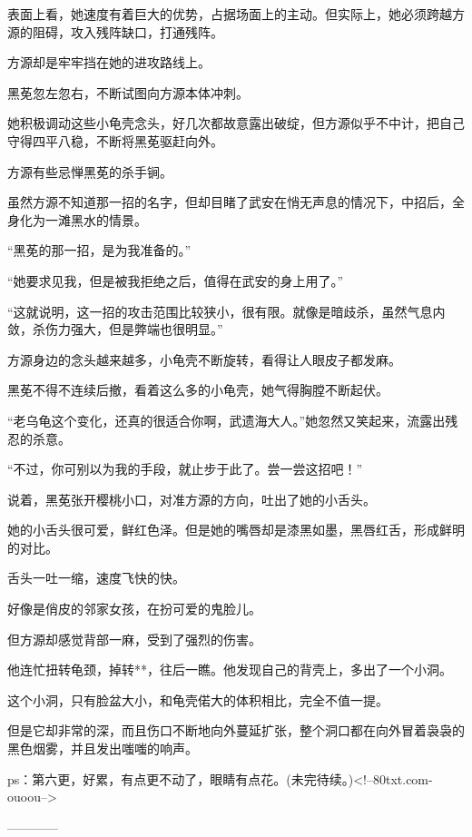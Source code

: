 \begin{this_body}
表面上看，她速度有着巨大的优势，占据场面上的主动。但实际上，她必须跨越方源的阻碍，攻入残阵缺口，打通残阵。

方源却是牢牢挡在她的进攻路线上。

黑莬忽左忽右，不断试图向方源本体冲刺。

她积极调动这些小龟壳念头，好几次都故意露出破绽，但方源似乎不中计，把自己守得四平八稳，不断将黑莬驱赶向外。

方源有些忌惮黑莬的杀手锏。

虽然方源不知道那一招的名字，但却目睹了武安在悄无声息的情况下，中招后，全身化为一滩黑水的情景。

“黑莬的那一招，是为我准备的。”

“她要求见我，但是被我拒绝之后，值得在武安的身上用了。”

“这就说明，这一招的攻击范围比较狭小，很有限。就像是暗歧杀，虽然气息内敛，杀伤力强大，但是弊端也很明显。”

方源身边的念头越来越多，小龟壳不断旋转，看得让人眼皮子都发麻。

黑莬不得不连续后撤，看着这么多的小龟壳，她气得胸膛不断起伏。

“老乌龟这个变化，还真的很适合你啊，武遗海大人。”她忽然又笑起来，流露出残忍的杀意。

“不过，你可别以为我的手段，就止步于此了。尝一尝这招吧！”

说着，黑莬张开樱桃小口，对准方源的方向，吐出了她的小舌头。

她的小舌头很可爱，鲜红色泽。但是她的嘴唇却是漆黑如墨，黑唇红舌，形成鲜明的对比。

舌头一吐一缩，速度飞快的快。

好像是俏皮的邻家女孩，在扮可爱的鬼脸儿。

但方源却感觉背部一麻，受到了强烈的伤害。

他连忙扭转龟颈，掉转**，往后一瞧。他发现自己的背壳上，多出了一个小洞。

这个小洞，只有脸盆大小，和龟壳偌大的体积相比，完全不值一提。

但是它却非常的深，而且伤口不断地向外蔓延扩张，整个洞口都在向外冒着袅袅的黑色烟雾，并且发出嗤嗤的响声。

ps：第六更，好累，有点更不动了，眼睛有点花。(未完待续。)<!--80txt.com-ouoou-->

------------

\end{this_body}

